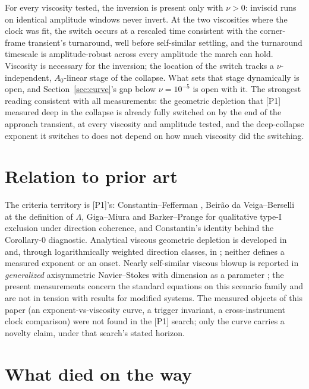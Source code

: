 \documentclass[11pt]{article}
\newcommand{\Lam}{\Lambda}
\newcommand{\Anaught}{A_0}
\begin{document}
For every viscosity tested, the inversion is present only with
$\nu>0$: inviscid runs on identical amplitude windows never invert. At
the two viscosities where the clock was fit, the switch occurs at a
rescaled time consistent with the corner-frame transient's turnaround,
well before self-similar settling, and the turnaround timescale is
amplitude-robust across every amplitude the march can hold. Viscosity
is necessary for the inversion; the location of the switch tracks a
$\nu$-independent, $\Anaught$-linear stage of the collapse. What sets
that stage dynamically is open, and Section~\ref{sec:curve}'s gap below
$\nu=10^{-5}$ is open with it. The strongest reading consistent with
all measurements: the geometric depletion that [P1] measured deep in
the collapse is already fully switched on by the end of the approach
transient, at every viscosity and amplitude tested, and the
deep-collapse exponent it switches to does not depend on how much
viscosity did the switching.

\section{Relation to prior art}\label{sec:prior}

The criteria territory is [P1]'s: Constantin--Fefferman \cite{CF93},
Beir\~ao da Veiga--Berselli \cite{BdVB02,BdVB09} at the definition of
$\Lam$, Giga--Miura \cite{GM11} and Barker--Prange \cite{BP20} for
qualitative type-I exclusion under direction coherence, and
Constantin's identity \cite{Con94} behind the Corollary-0 diagnostic.
Analytical viscous geometric depletion is developed in \cite{Ju06} and,
through logarithmically weighted direction classes, in \cite{Gru26};
neither defines a measured exponent or an onset. Nearly self-similar
viscous blowup is reported in \emph{generalized} axisymmetric
Navier--Stokes with dimension as a parameter \cite{Hou24}; the present
measurements concern the standard equations on this scenario family
and are not in tension with results for modified systems. The measured
objects of this paper (an exponent-vs-viscosity curve, a trigger
invariant, a cross-instrument clock comparison) were not found in the
[P1] search; only the curve carries a novelty claim, under that
search's stated horizon.

\section{What died on the way}\label{sec:corpses}
\end{document}
